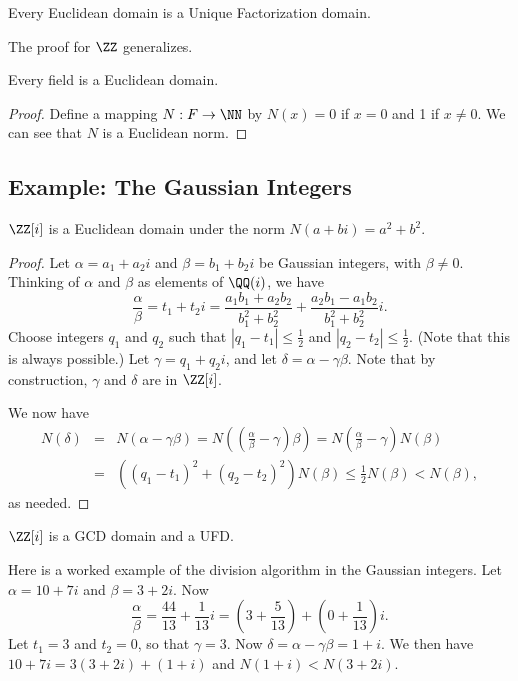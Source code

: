 \documentclass{article}
\begin{document}
\begin{prop}
Every Euclidean domain is a Unique Factorization domain.
\end{prop}

The proof for $\ZZ$ generalizes.

\begin{prop}
Every field is a Euclidean domain.
\end{prop}

\begin{proof}
Define a mapping $N : F \rightarrow \NN$ by $N(x) = 0$ if $x = 0$ and 1 if $x \neq 0$. We can see that $N$ is a Euclidean norm.
\end{proof}

\subsection*{Example: The Gaussian Integers}

\begin{prop}
$\ZZ[i]$ is a Euclidean domain under the norm $N(a+bi) = a^2 + b^2$.
\end{prop}

\begin{proof}
Let $\alpha = a_1 + a_2 i$ and $\beta = b_1 + b_2 i$ be Gaussian integers, with $\beta \neq 0$. Thinking of $\alpha$ and $\beta$ as elements of $\QQ(i)$, we have \[ \frac{\alpha}{\beta} = t_1 + t_2 i = \frac{a_1b_1 + a_2b_2}{b_1^2 + b_2^2} + \frac{a_2b_1 - a_1b_2}{b_1^2 + b_2^2} i. \] Choose integers $q_1$ and $q_2$ such that $|q_1 - t_1| \leq \frac{1}{2}$ and $|q_2 - t_2| \leq \frac{1}{2}$. (Note that this is always possible.) Let $\gamma = q_1 + q_2 i$, and let $\delta = \alpha - \gamma\beta$. Note that by construction, $\gamma$ and $\delta$ are in $\ZZ[i]$.

We now have
\begin{eqnarray*}
N(\delta) & = & N(\alpha - \gamma\beta) = N\left((\frac{\alpha}{\beta} - \gamma)\beta\right) = N(\frac{\alpha}{\beta} - \gamma)N(\beta) \\
 & = & ((q_1-t_1)^2 + (q_2-t_2)^2)N(\beta) \leq \frac{1}{2}N(\beta) < N(\beta),
\end{eqnarray*}
as needed.
\end{proof}

\begin{cor}
$\ZZ[i]$ is a GCD domain and a UFD.
\end{cor}

Here is a worked example of the division algorithm in the Gaussian integers. Let $\alpha = 10+7i$ and $\beta = 3+2i$. Now \[ \frac{\alpha}{\beta} = \frac{44}{13} + \frac{1}{13}i = (3 + \frac{5}{13}) + (0 + \frac{1}{13})i. \] Let $t_1 = 3$ and $t_2 = 0$, so that $\gamma = 3$. Now $\delta = \alpha - \gamma\beta = 1+i$. We then have $10+7i = 3(3+2i) + (1+i)$ and $N(1+i) < N(3+2i)$.
\end{document}

